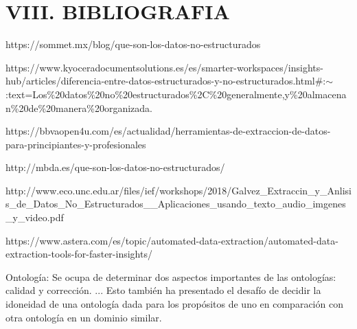 \documentclass{article} %
\begin{document}
\noindent 
\section{}

\noindent 
\section{VIII. BIBLIOGRAFIA}

\noindent \textbf{}

 https://sommet.mx/blog/que-son-los-datos-no-estructurados

 https://www.kyoceradocumentsolutions.es/es/smarter-workspaces/insights-hub/articles/diferencia-entre-datos-estructurados-y-no-estructurados.html\#:$\mathrm{\sim}$:text=Los\%20datos\%20no\%20estructurados\%2C\%20generalmente,y\%20almacenan\%20de\%20manera\%20organizada.

 https://bbvaopen4u.com/es/actualidad/herramientas-de-extraccion-de-datos-para-principiantes-y-profesionales

 http://mbda.es/que-son-los-datos-no-estructurados/

 http://www.eco.unc.edu.ar/files/ief/workshops/2018/Galvez\_Extraccin\_y\_Anlisis\_de\_Datos\_No\_Estructurados\_\_Aplicaciones\_usando\_texto\_audio\_imgenes\_y\_video.pdf

 https://www.astera.com/es/topic/automated-data-extraction/automated-data-extraction-tools-for-faster-insights/

 Ontolog\'{i}a: Se ocupa de determinar dos aspectos importantes de las ontolog\'{i}as: calidad y correcci\'{o}n. ... Esto tambi\'{e}n ha presentado el desaf\'{i}o de decidir la idoneidad de una ontolog\'{i}a dada para los prop\'{o}sitos de uno en comparaci\'{o}n con otra ontolog\'{i}a en un dominio similar.
\end{document}
